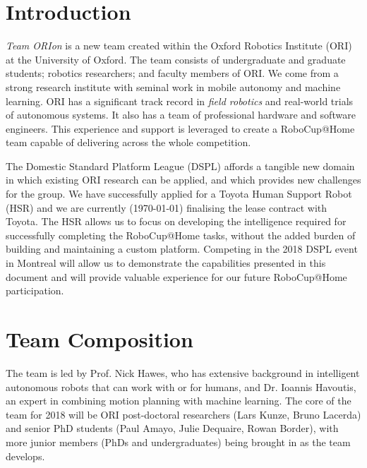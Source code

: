 \documentclass[runningheads,a4paper]{llncs}
\newcommand{\teamori}{Team ORIon}
\begin{document}

\section{Introduction}

\textit{\teamori{}} is a new team created within the Oxford Robotics Institute
(ORI) at the University of Oxford. The team consists of undergraduate and
graduate students; robotics researchers; and faculty members of ORI. We come
from a strong research institute with seminal work in mobile autonomy and
machine learning. ORI has a significant track record in \emph{field robotics}
and real-world trials of autonomous systems. It also has a team of professional
hardware and software engineers. This experience and support is leveraged
to create a RoboCup@Home team capable of delivering across the whole
competition. 

The Domestic Standard Platform League (DSPL) affords a tangible new domain in
which existing ORI research can be applied, and which provides new challenges
for the group. 
We have successfully applied for a Toyota Human Support Robot (HSR) and we are 
currently (\today) finalising the lease contract with Toyota.
The HSR allows us to focus on developing the
intelligence required for successfully completing the RoboCup@Home tasks, 
without the added burden of building and maintaining a custom platform. 
Competing in the 2018 DSPL event in Montreal will allow us to demonstrate 
the capabilities presented in this document and will provide valuable experience
for our future RoboCup@Home participation.

\section{Team Composition}

The team is led by Prof. Nick Hawes, who has extensive background in
intelligent autonomous robots that can work with or for humans, and Dr. Ioannis Havoutis, an expert in combining motion planning with machine learning. The core of the team for 2018 will be ORI post-doctoral researchers (Lars Kunze, Bruno Lacerda) and senior PhD students (Paul Amayo, Julie Dequaire, Rowan Border), with more junior members (PhDs and undergraduates) being brought in as the team develops. 
\end{document}
